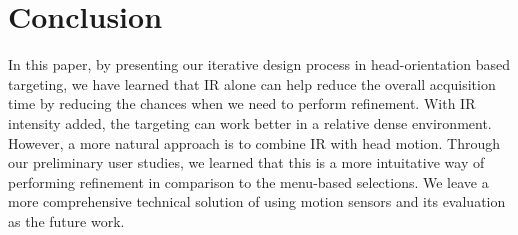 
\section{Conclusion}
\label{sec:conclusion}

In this paper, by presenting our iterative design process in head-orientation based targeting, we have learned that IR alone can help reduce the overall acquisition time by reducing the chances when we need to perform refinement. With IR intensity added, the targeting can work better in a relative dense environment. However, a more natural approach is to combine IR with head motion. Through our preliminary user studies, we learned that this is a more intuitative way of performing refinement in comparison to the menu-based selections. We leave a more comprehensive technical solution of using motion sensors and its evaluation as the future work.

